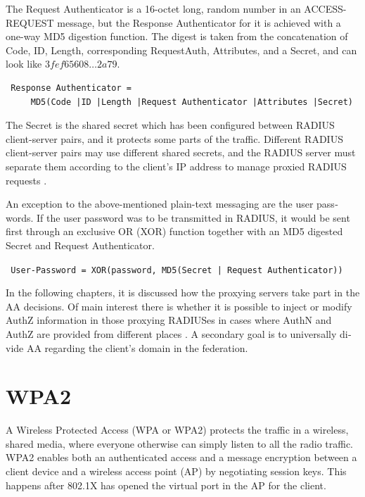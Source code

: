 \documentclass[12pt,a4paper,english]{tutthesis}
\begin{document}
\begin{otherlanguage}{english}
The Request Authenticator is a 16-octet long, random number in an
ACCESS-REQUEST message, but the Response Authenticator for it is achieved
with a one-way MD5 digestion function. 
The digest is taken from the concatenation of Code, ID, Length, corresponding
Request\-Auth, Attributes, and a Secret, and can look like 
$3fef65608\ldots 2a79$. 
\begin{verbatim}
 Response Authenticator = 
     MD5(Code |ID |Length |Request Authenticator |Attributes |Secret)
\end{verbatim}
The Secret is the shared secret which has been configured between
RADIUS client-server pairs,
and it protects some parts of the traffic. 
Different RADIUS client-server pairs may use different
shared secrets, and the RADIUS server must separate them according to the client's IP address to
manage proxied RADIUS requests \cite{radiusbook}.

An exception to the above-mentioned plain-text messaging are the user passwords.
If the user password was to be transmitted in RADIUS, it would be sent first
through an exclusive OR (XOR) function together with an MD5 digested Secret
and Request Authenticator.
\begin{center}
{\tt 
User-Password = XOR(password, MD5(Secret | Request Authenticator))}
\end{center}




In the following chapters, it is discussed how the proxying servers take 
part in the AA decisions. Of main interest there is whether it is possible 
to inject or modify AuthZ information in those proxying RADIUSes in
cases where AuthN and AuthZ are provided from different
 places \cite{rfc2607}. A secondary goal is to universally divide AA regarding 
the client's domain in the federation.




\section{WPA2}
\label{sec-2-3}

A Wireless Protected Access (WPA or WPA2) protects the traffic in a wireless,
shared media, where everyone otherwise can simply listen to all the radio traffic.
WPA2 enables both an authenticated access and a message
encryption between a client device and  a wireless access point (AP)
by negotiating session keys. This happens 
after 802.1X has opened the virtual port in the AP for the client.


\end{otherlanguage}
\end{document}
